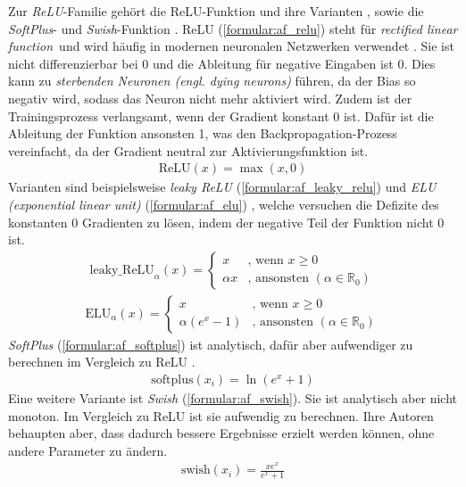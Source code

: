 \newline
\newline
Zur \textit{ReLU}-Familie \cite{apicella2021survey} gehört die ReLU-Funktion \cite{glorot2011deep, konda2014zero, elfwing2018sigmoid, alcaide2018swish} und
ihre Varianten \cite{maas2013rectifier}, sowie die \textit{SoftPlus}- \cite{dugas2001incorporating} und \textit{Swish}-Funktion \cite{ramachandran2017searching}.
ReLU (\ref{formular:af_relu}) steht für \glqq\textit{rectified linear function}\grqq\ und wird häufig in modernen neuronalen Netzwerken verwendet \cite{apicella2021survey}.
Sie ist nicht differenzierbar bei 0 und die Ableitung für negative Eingaben ist 0.
Dies kann zu \textit{sterbenden Neuronen (engl. dying neurons)} führen, da der Bias so negativ wird, sodass das Neuron nicht mehr aktiviert wird.
Zudem ist der Trainingsprozess verlangsamt, wenn der Gradient konstant 0 ist.
Dafür ist die Ableitung der Funktion ansonsten 1, was den Backpropagation-Prozess vereinfacht, da der Gradient neutral zur Aktivierungsfunktion ist.
\begin{align}
    \label{formular:af_relu}
    \text{ReLU}(x) = \max(x, 0)
\end{align}
Varianten sind beispielsweise \textit{leaky ReLU} \cite{maas2013rectifier} (\ref{formular:af_leaky_relu}) und \textit{ELU (exponential linear unit)} (\ref{formular:af_elu})
\cite{clevert2015fast}, welche versuchen die Defizite des konstanten 0 Gradienten zu lösen, indem der negative Teil der Funktion nicht 0 ist.
\begin{align}
    \label{formular:af_leaky_relu}
    \text{leaky\_ReLU}_{\alpha}(x) = \begin{cases}
                               x & \text{, wenn } x \geq 0\\
                               \alpha x & \text{, ansonsten } (\alpha\in \mathbb{R}_{0})
    \end{cases}
\end{align}
\begin{align}
    \label{formular:af_elu}
    \text{ELU}_{\alpha}(x) = \begin{cases}
                                 x & \text{, wenn } x \geq 0\\
                                 \alpha(e^{x} - 1) & \text{, ansonsten } (\alpha\in \mathbb{R}_{0})
    \end{cases}
\end{align}
\textit{SoftPlus} (\ref{formular:af_softplus}) ist analytisch, dafür aber aufwendiger zu berechnen im Vergleich zu ReLU \cite{apicella2021survey}.
\begin{align}
    \label{formular:af_softplus}
    \text{softplus}(x_i) = \ln(e^x + 1)
\end{align}
Eine weitere Variante ist \textit{Swish} \cite{ramachandran2017searching} (\ref{formular:af_swish}).
Sie ist analytisch aber nicht monoton.
Im Vergleich zu ReLU ist sie aufwendig zu berechnen.
Ihre Autoren behaupten aber, dass dadurch bessere Ergebnisse erzielt werden können, ohne andere Parameter zu ändern.
\begin{align}
    \label{formular:af_swish}
    \text{swish}(x_i) = \frac{xe^x}{e^x + 1}
\end{align}